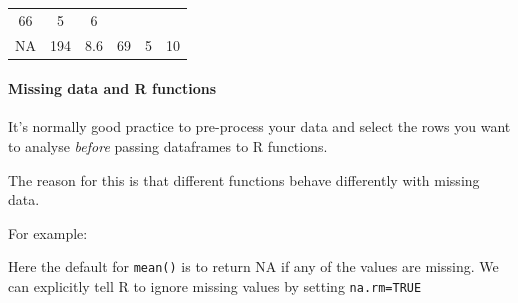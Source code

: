 \documentclass[]{article}
\newenvironment{Shaded}{\begin{snugshade}}{\end{snugshade}}
\newcommand{\KeywordTok}[1]{\textcolor[rgb]{0.13,0.29,0.53}{\textbf{#1}}}
\newcommand{\OperatorTok}[1]{\textcolor[rgb]{0.81,0.36,0.00}{\textbf{#1}}}
\newcommand{\NormalTok}[1]{#1}
\let\oldparagraph\paragraph
\renewcommand{\paragraph}[1]{\oldparagraph{#1}\mbox{}}
\theoremstyle{definition}
\theoremstyle{definition}
\theoremstyle{definition}
\theoremstyle{remark}
\begin{document}
\begin{longtable}[]{@{}cccccc@{}}
\begin{minipage}[t]{0.08\columnwidth}
66\strut
\end{minipage} & \begin{minipage}[t]{0.09\columnwidth}\centering\strut
5\strut
\end{minipage} & \begin{minipage}[t]{0.06\columnwidth}\centering\strut
6\strut
\end{minipage}\tabularnewline
\begin{minipage}[t]{0.09\columnwidth}\centering\strut
NA\strut
\end{minipage} & \begin{minipage}[t]{0.12\columnwidth}\centering\strut
194\strut
\end{minipage} & \begin{minipage}[t]{0.08\columnwidth}\centering\strut
8.6\strut
\end{minipage} & \begin{minipage}[t]{0.08\columnwidth}\centering\strut
69\strut
\end{minipage} & \begin{minipage}[t]{0.09\columnwidth}\centering\strut
5\strut
\end{minipage} & \begin{minipage}[t]{0.06\columnwidth}\centering\strut
10\strut
\end{minipage}\tabularnewline
\bottomrule
\end{longtable}

\paragraph{Missing data and R functions}\label{na.rm}

It's normally good practice to pre-process your data and select the rows
you want to analyse \emph{before} passing dataframes to R functions.

The reason for this is that different functions behave differently with
missing data.

For example:

\begin{Shaded}
\end{Shaded}

Here the default for \texttt{mean()} is to return NA if any of the
values are missing. We can explicitly tell R to ignore missing values by
setting \texttt{na.rm=TRUE}
\end{document}
